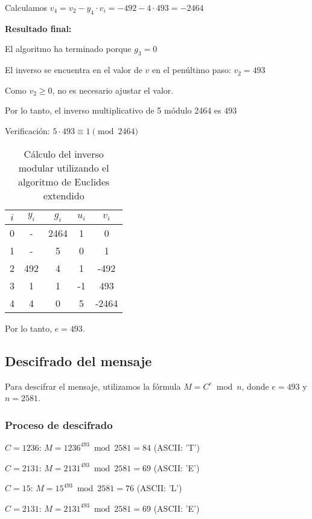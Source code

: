 Calculamos $v_4 = v_2 - y_4 \cdot v_i = -492 - 4 \cdot 493 = -2464$



\textbf{Resultado final:}

El algoritmo ha terminado porque $g_3 = 0$

El inverso se encuentra en el valor de $v$ en el penúltimo paso: $v_2 = 493$

Como $v_2 \geq 0$, no es necesario ajustar el valor.

Por lo tanto, el inverso multiplicativo de 5 módulo 2464 es 493

Verificación: $5 \cdot 493 \equiv 1 \pmod{2464}$

\begin{table}[h]
\centering
\begin{tabular}{|c|c|c|c|c|}
\hline
$i$ & $y_i$ & $g_i$ & $u_i$ & $v_i$ \\ \hline
0 & - & 2464 & 1 & 0 \\ \hline
1 & - & 5 & 0 & 1 \\ \hline
2 & 492 & 4 & 1 & -492 \\ \hline
3 & 1 & 1 & -1 & 493 \\ \hline
4 & 4 & 0 & 5 & -2464 \\ \hline
\end{tabular}
\caption{Cálculo del inverso modular utilizando el algoritmo de Euclides extendido}
\label{tab:euclides}
\end{table}

Por lo tanto, $e = 493$.

\subsection{Descifrado del mensaje}

Para descifrar el mensaje, utilizamos la fórmula $M = C^e \bmod n$, donde $e = 493$ y $n = 2581$.

\subsubsection{Proceso de descifrado}

$C = 1236$: $M = 1236^{493} \bmod 2581 = 84$ (ASCII: 'T')

$C = 2131$: $M = 2131^{493} \bmod 2581 = 69$ (ASCII: 'E')

$C = 15$: $M = 15^{493} \bmod 2581 = 76$ (ASCII: 'L')

$C = 2131$: $M = 2131^{493} \bmod 2581 = 69$ (ASCII: 'E')

